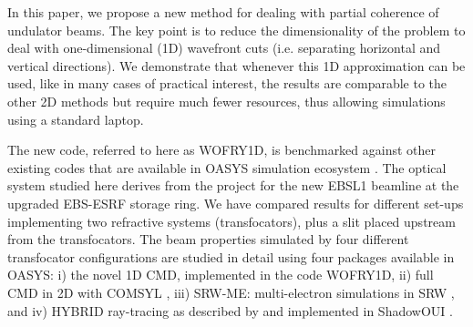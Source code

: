 \documentclass[preprint]{iucr}
\newcommand{\inred}[1]{{\color{red}#1}}
\begin{document}
In this paper\inred{,} we propose a new method for dealing with partial coherence of undulator beams. The key point is to reduce the dimensionality of the problem to deal with one-dimensional (1D) wavefront cuts (i.e. separating horizontal and vertical directions). 
We demonstrate that whenever this 1D approximation can be used, like in many cases of practical interest, the results are comparable to the other 2D methods but require much \inred{fewer} resources, thus allowing simulations using a standard laptop. 

The new code, referred to here as WOFRY1D, is benchmarked against other existing codes that are available in OASYS simulation ecosystem \cite{codeOASYS}. The optical system studied here derives from the project for the new EBSL1 beamline at the upgraded EBS-ESRF storage ring. We have compared results for different set-ups implementing two refractive systems (transfocators), plus a slit placed upstream from the transfocators. The beam properties simulated by four different transfocator configurations are studied in detail using four packages available in OASYS: i) the novel 1D CMD, implemented in the code WOFRY1D, ii) full CMD in 2D with COMSYL \cite{codeCOMSYL}, iii) SRW-ME: multi-electron simulations in SRW \cite{codeSRW}, and iv) HYBRID ray-tracing as described by  and implemented in ShadowOUI \cite{codeSHADOWOUI}.
\end{document}
